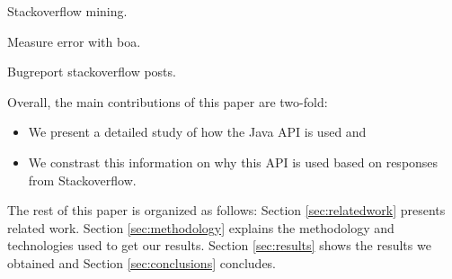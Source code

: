  
Stackoverflow mining.

Measure error with boa.


Bugreport stackoverflow posts.


Overall, the main contributions of this paper are two-fold:
\begin{itemize}
\item We present a detailed study of how the Java \smu{} API is used and
\item We constrast this information on why this API is used based on responses from Stackoverflow.
\end{itemize}

The rest of this paper is organized as follows:
Section \ref{sec:relatedwork} presents related work.
Section \ref{sec:methodology} explains the methodology and technologies used to get our results.
Section \ref{sec:results} shows the results we obtained and Section \ref{sec:conclusions} concludes.
